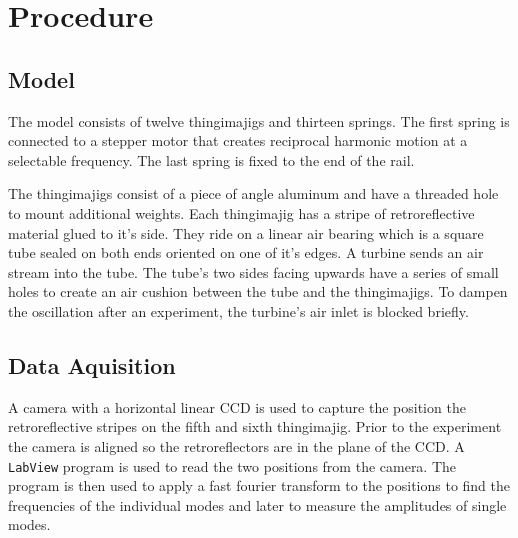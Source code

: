 \chapter{Procedure}
\section{Model}
The model consists of twelve thingimajigs and thirteen springs.
The first spring is connected to a stepper motor that creates reciprocal harmonic motion at a selectable frequency.
The last spring is fixed to the end of the rail.

The thingimajigs consist of a piece of angle aluminum and have a threaded hole to mount additional weights.
Each thingimajig has a stripe of retroreflective material glued to it's side.
They ride on a linear air bearing which is a square tube sealed on both ends oriented on one of it's edges.
A turbine sends an air stream into the tube.
The tube's two sides facing upwards have a series of small holes to create an air cushion between the tube and the thingimajigs.
To dampen the oscillation after an experiment, the turbine's air inlet is blocked briefly.

\section{Data Aquisition}
A camera with a horizontal linear CCD is used to capture the position the retroreflective stripes on the fifth and sixth thingimajig.
Prior to the experiment the camera is aligned so the retroreflectors are in the plane of the CCD.
A \texttt{LabView} program is used to read the two positions from the camera.
The program is then used to apply a fast fourier transform to the positions to find the frequencies of the individual modes and later to measure the amplitudes of single modes.
